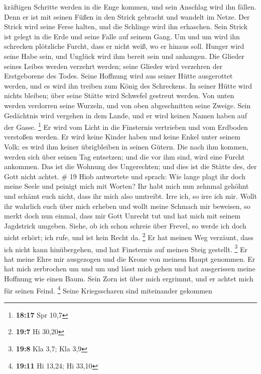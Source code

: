 kräftigen Schritte werden in die Enge kommen, und sein Anschlag wird ihn
fällen.  Denn er ist mit seinen Füßen in den Strick gebracht
und wandelt im Netze.  Der Strick wird seine Ferse halten,
und die Schlinge wird ihn erhaschen.  Sein Strick ist
gelegt in die Erde und seine Falle auf seinem Gang.  Um und
um wird ihn schrecken plötzliche Furcht, dass er nicht weiß, wo er
hinaus soll.  Hunger wird seine Habe sein, und Unglück wird
ihm bereit sein und anhangen.  Die Glieder seines Leibes
werden verzehrt werden; seine Glieder wird verzehren der Erstgeborene
des Todes.  Seine Hoffnung wird aus seiner Hütte
ausgerottet werden, und es wird ihn treiben zum König des Schreckens.
 In seiner Hütte wird nichts bleiben; über seine Stätte
wird Schwefel gestreut werden.  Von unten werden verdorren
seine Wurzeln, und von oben abgeschnitten seine Zweige. 
Sein Gedächtnis wird vergehen in dem Lande, und er wird keinen Namen
haben auf der Gasse. \footnote{\textbf{18:17} Spr 10,7}  Er
wird vom Licht in die Finsternis vertrieben und vom Erdboden verstoßen
werden.  Er wird keine Kinder haben und keine Enkel unter
seinem Volk; es wird ihm keiner übrigbleiben in seinen Gütern.
 Die nach ihm kommen, werden sich über seinen Tag
entsetzen; und die vor ihm sind, wird eine Furcht ankommen.
 Das ist die Wohnung des Ungerechten; und dies ist die
Stätte des, der Gott nicht achtet. \# 19  Hiob antwortete
und sprach:  Wie lange plagt ihr doch meine Seele und
peinigt mich mit Worten?  Ihr habt mich nun zehnmal gehöhnt
und schämt euch nicht, dass ihr mich also umtreibt.  Irre
ich, so irre ich mir.  Wollt ihr wahrlich euch über mich
erheben und wollt meine Schmach mir beweisen,  so merkt doch
nun einmal, dass mir Gott Unrecht tut und hat mich mit seinem Jagdstrick
umgeben.  Siehe, ob ich schon schreie über Frevel, so werde
ich doch nicht erhört; ich rufe, und ist kein Recht da. \footnote{\textbf{19:7}
  Hi 30,20}  Er hat meinen Weg verzäunt, dass ich nicht kann
hinübergehen, und hat Finsternis auf meinen Steig gestellt. \footnote{\textbf{19:8}
  Kla 3,7; Kla 3,9}  Er hat meine Ehre mir ausgezogen und
die Krone von meinem Haupt genommen.  Er hat mich
zerbrochen um und um und lässt mich gehen und hat ausgerissen meine
Hoffnung wie einen Baum.  Sein Zorn ist über mich ergrimmt,
und er achtet mich für seinen Feind. \footnote{\textbf{19:11} Hi 13,24;
  Hi 33,10}  Seine Kriegsscharen sind miteinander gekommen
